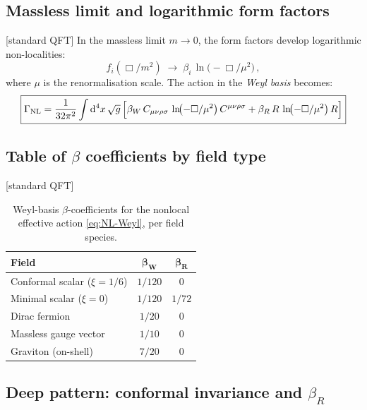 \documentclass[12pt,a4paper]{article}
\theoremstyle{definition}
\theoremstyle{remark}
\newcommand{\dd}{\mathrm{d}}
\newcommand{\stdqft}{\textcolor{teal!80!black}{\textsf{[standard QFT]}}}
\begin{document}
\subsection{Massless limit and logarithmic form factors}

\stdqft\;
In the massless limit $m\to 0$, the form factors develop logarithmic
non-localities:
\begin{equation}
  f_i(\Box/m^2)
  \;\longrightarrow\;
  \beta_i\,\ln\!\bigl(-\Box/\mu^2\bigr)\,,
  \label{eq:log-limit}
\end{equation}
where $\mu$ is the renormalisation scale.  The action in the
\emph{Weyl basis} becomes:
\begin{equation}
  \boxed{
  \Gamma_{\mathrm{NL}}
  = \frac{1}{32\pi^2}
    \int\dd^4x\,\sqrt{g}\,\Bigl[
      \beta_W\, C_{\mu\nu\rho\sigma}\,
        \ln\!\bigl(-\Box/\mu^2\bigr)\, C^{\mu\nu\rho\sigma}
    + \beta_R\, R\,
        \ln\!\bigl(-\Box/\mu^2\bigr)\, R
    \Bigr]
  }
  \label{eq:NL-Weyl}
\end{equation}


\subsection{Table of \texorpdfstring{$\beta$}{beta} coefficients
            by field type}

\stdqft\;
\begin{table}[h]
\centering
\renewcommand{\arraystretch}{1.4}
\begin{tabular}{@{}lcc@{}}
\toprule
\textbf{Field} & $\boldsymbol{\beta_W}$ & $\boldsymbol{\beta_R}$ \\
\midrule
Conformal scalar ($\xi=1/6$) & $1/120$   & $0$    \\
Minimal scalar ($\xi=0$)     & $1/120$   & $1/72$ \\
Dirac fermion                & $1/20$    & $0$    \\
Massless gauge vector        & $1/10$    & $0$    \\
Graviton (on-shell)          & $7/20$    & $0$    \\
\bottomrule
\end{tabular}
\caption{Weyl-basis $\beta$-coefficients for the nonlocal effective
action \eqref{eq:NL-Weyl}, per field species.}
\label{tab:betas}
\end{table}

\subsection{Deep pattern: conformal invariance and \texorpdfstring{$\beta_R$}{betaR}}
\end{document}
